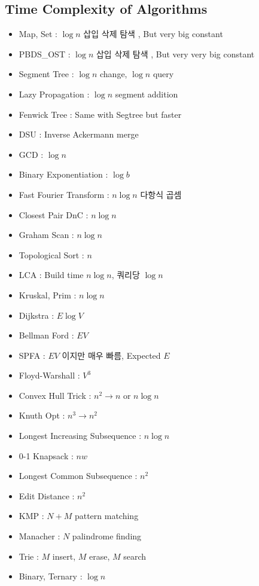 \documentclass[landscape,8pt]{article}
\begin{document}
\begin{multicols}{2}
  \subsection{Time Complexity of Algorithms}
    \begin{itemize}
      \item Map, Set : $\log n$ 삽입 삭제 탐색 , But very big constant
      \item PBDS\_OST : $\log n$ 삽입 삭제 탐색 , But very very big constant
      \item Segment Tree : $\log n$ change, $\log n$ query
      \item Lazy Propagation : $\log n$ segment addition
      \item Fenwick Tree : Same with Segtree but faster
      \item DSU : Inverse Ackermann merge
      \item GCD : $\log n$
      \item Binary Exponentiation : $\log b$
      \item Fast Fourier Transform : $n\log n$ 다항식 곱셈
      \item Closest Pair DnC : $n \log n$
      \item Graham Scan : $n \log n$
      \item Topological Sort : $n$
      \item LCA : Build time $n \log n$, 쿼리당 $\log n$
      \item Kruskal, Prim : $n\log n$
      \item Dijkstra : $E \log V$
      \item Bellman Ford : $EV$
      \item SPFA : $EV$ 이지만 매우 빠름, Expected $E$
      \item Floyd-Warshall : $V^3$
      \item Convex Hull Trick : $n^2 \to n$ or $n \log n$
      \item Knuth Opt : $n^3 \to n^2$
      \item Longest Increasing Subsequence : $n \log n$
      \item 0-1 Knapsack : $nw$
      \item Longest Common Subsequence : $n^2$
      \item Edit Distance : $n^2$
      \item KMP : $N+M$ pattern matching
      \item Manacher : $N$ palindrome finding
      \item Trie : $M$ insert, $M$ erase, $M$ search
      \item Binary, Ternary : $\log n$
    \end{itemize}


\end{multicols}
\end{document}
